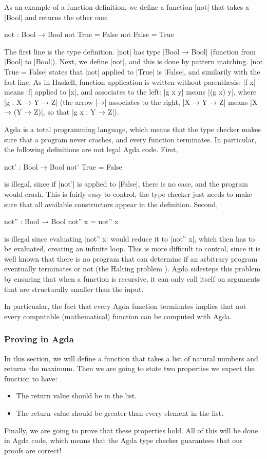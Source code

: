 As an example of a function definition, we define a function |not| that takes a |Bool| and returns the other one:
\begin{code}
not : Bool → Bool
not True = False
not False = True
\end{code}
The first line is the type definition. |not| has type |Bool → Bool| (function from |Bool| to |Bool|). Next, we define |not|, and this is done by pattern matching. |not True = False| states that |not| applied to |True| is |False|, and similarily with the last line. As in Haskell, function application is written without parenthesis: |f x| means |f| applied to |x|, and associates to the left: |g x y| means |(g x) y|, where |g : X → Y → Z| (the arrow |→| associates to the right, |X → Y → Z| means |X → (Y → Z)|, so that |g x : Y → Z|).

Agda is a total programming language, which means that the type checker makes sure that a program never crashes, and every function terminates. In particular, the following definitions are not legal Agda code. First,
\begin{code}
not' : Bool → Bool
not' True = False
\end{code}
is illegal, since if |not'| is applied to |False|, there is no case, and the program would crash. This is fairly easy to control, the type checker just needs to make sure that all available constructors appear in the definition. Second,
\begin{code}
not'' : Bool → Bool
not'' x = not'' x
\end{code}
is illegal since evaluating |not'' x| would reduce it to |not'' x|, which then has to be evaluated, creating an infinite loop. This is more difficult to control, since it is well known that there is no program that can determine if an arbitrary program eventually terminates or not (the Halting problem \cite{Turing}). Agda sidesteps this problem by ensuring that when a function is recursive, it can only call itself on arguments that are structurally smaller than the input. 

In particualar, the fact that every Agda function terminates implies that not every computable (mathematical) function can be computed with Agda.

\subsubsection{Proving in Agda}
In this section, we will define a function that takes a list of natural numbers and returns the maximum. Then we are going to state two properties we expect the function to have: 
\begin{itemize}
\item The return value should be in the list.
\item The return value should be greater than every element in the list.
\end{itemize}
Finally, we are going to prove that these properties hold. All of this will be done in Agda code, which means that the Agda type checker guarantees that our proofs are correct!

